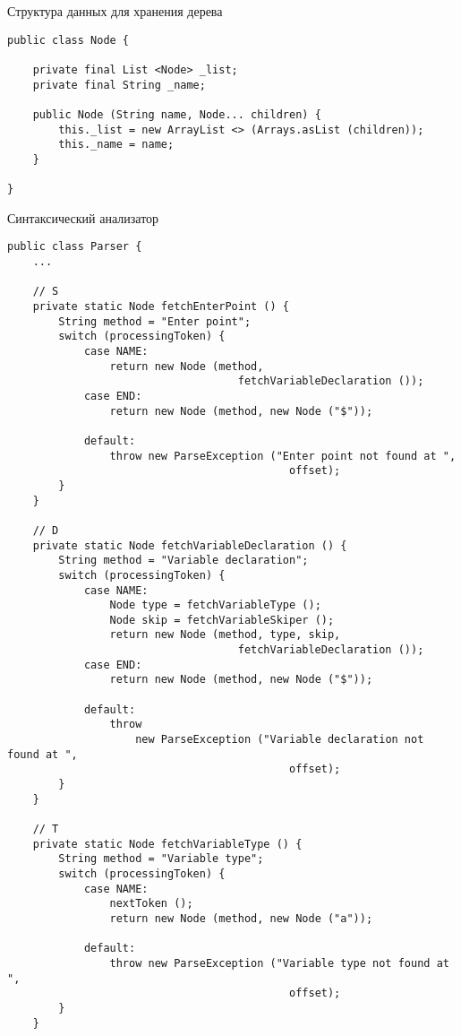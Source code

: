 \documentclass[12pt]{article}
\begin{document}
\begin{itemize}
        Структура данных для хранения дерева
        \begin{verbatim}
public class Node {

    private final List <Node> _list;
    private final String _name;
    
    public Node (String name, Node... children) {
        this._list = new ArrayList <> (Arrays.asList (children));
        this._name = name;
    }
    
}
        \end{verbatim}

        Синтаксический анализатор

        \begin{verbatim}
public class Parser {
    ...

    // S
    private static Node fetchEnterPoint () {
        String method = "Enter point";
        switch (processingToken) {
            case NAME:
                return new Node (method, 
                                    fetchVariableDeclaration ());
            case END:
                return new Node (method, new Node ("$"));
                
            default:
                throw new ParseException ("Enter point not found at ", 
                                            offset);
        }
    }
    
    // D
    private static Node fetchVariableDeclaration () {
        String method = "Variable declaration";
        switch (processingToken) {
            case NAME:
                Node type = fetchVariableType ();
                Node skip = fetchVariableSkiper ();
                return new Node (method, type, skip, 
                                    fetchVariableDeclaration ());
            case END:
                return new Node (method, new Node ("$"));
                
            default:
                throw 
                    new ParseException ("Variable declaration not found at ", 
                                            offset);
        }
    }
    
    // T
    private static Node fetchVariableType () {
        String method = "Variable type";
        switch (processingToken) {
            case NAME:
                nextToken ();
                return new Node (method, new Node ("a"));
                
            default:
                throw new ParseException ("Variable type not found at ", 
                                            offset);
        }
    }
    

\end{verbatim}
\end{itemize}
\end{document}
